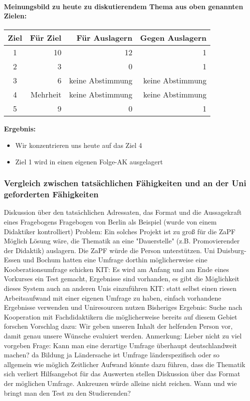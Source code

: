 			\paragraph{Meinungsbild zu heute zu diskutierendem Thema aus oben genannten Zielen:}
				\begin{tabular}{c|r|r|r}
					Ziel & Für Ziel	& Für Auslagern	& Gegen Auslagern  \\ \hline
					1 &	10 & 12	& 1 \\
					2	& 3	& 0	& 1 \\
					3	& 6	& keine Abstimmung & keine Abstimmung \\
					4 &	Mehrheit & keine Abstimmung &	keine Abstimmung \\
					5 &	9	& 0	& 1
				\end{tabular}

				\textbf{Ergebnis:}
				\begin{itemize}
					\item Wir konzentrieren uns heute auf das Ziel 4
					\item Ziel 1 wird in einen eigenen Folge-AK ausgelagert
				\end{itemize}

		\subsubsection*{Vergleich zwischen tatsächlichen Fähigkeiten und an der Uni geforderten Fähigkeiten}
			\begin{outline}
				\1 Diskussion über den tatsächlichen Adressaten, das Format und die Aussagekraft eines Fragebogens
				\1 Fragebogen von Berlin als Beispiel (wurde von einem Didaktiker kontrolliert)
				\1 Problem: Ein solches Projekt ist zu groß für die ZaPF
					\2 Möglich Lösung wäre, die Thematik an eine "Dauerstelle" (z.B. Promovierender der Didaktik) auslagern. Die ZaPF würde die Person unterstützen.
					\2 Uni Duisburg-Essen und Bochum hatten eine Umfrage dorthin möglicherweise eine Kooberationsumfrage schicken
					\2 KIT: Es wird am Anfang und am Ende eines Vorkurses ein Test gemacht, Ergebnisse sind vorhanden, es gibt die Möglichkeit dieses System auch an anderen Unis einzuführen
					\2 KIT: statt selbst einen riesen Arbeitsaufwand mit einer eigenen Umfrage zu haben, einfach vorhandene Ergebnisse verwenden und Uniresourcen nutzen
					\2 Bisheriges Ergebnis: Suche nach Kooperation mit Fachdidaktikern die möglicherweise bereits auf diesem Gebiet forschen
					\2 Vorschlag dazu: Wir geben unseren Inhalt der helfenden Person vor, damit genau unsere Wünsche evaluiert werden.
						\3 Anmerkung: Lieber nicht zu viel vorgeben
				\1 Frage: Kann man eine derartige Umfrage überhaupt deutschlandweit machen? da Bildung ja Ländersache ist
					\2 Umfrage länderspezifisch oder so allgemein wie möglich
					\2 Zeitlicher Aufwand könnte dazu führen, dass die Thematik sich verliert
				\1 Hilfsangebot für das Auswerten stellen
				\1 Diskussion über das Format der möglichen Umfrage. Ankreuzen würde alleine nicht reichen.
				\1 Wann und wie bringt man den Test zu den Studierenden?
			\end{outline}

